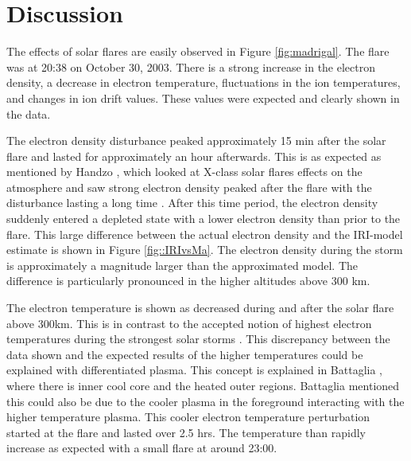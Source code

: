 

\section{Discussion}

The effects of solar flares are easily observed in Figure \ref{fig:madrigal}.
The flare was at 20:38 on October 30, 2003. There is a strong increase in the electron density, a decrease in electron temperature, fluctuations in the ion temperatures, and changes in ion drift values. These values were expected and clearly shown in the data. 

The electron density disturbance peaked approximately 15 min after the solar flare and lasted for approximately an hour afterwards. This is as expected as mentioned by Handzo \cite{Handzo}, which looked at X-class solar flares effects on the atmosphere and saw strong electron density peaked after the flare with the disturbance lasting a long time . After this time period, the electron density suddenly entered a depleted state with a lower electron density than prior to the flare. This large difference between the actual electron density and the IRI-model estimate is shown in Figure \ref{fig::IRIvsMa}. The electron density during the storm is approximately a magnitude larger than the approximated model. The difference is particularly pronounced in the higher altitudes above 300 km.

The electron temperature is shown as decreased during and after the solar flare above 300km. This is in contrast to the accepted notion of highest electron temperatures during the strongest solar storms \cite{Caspi}. This discrepancy between the data shown and the expected results of the higher temperatures could be explained with differentiated plasma. This concept is explained in Battaglia \cite{Battaglia}, where there is inner cool core and the heated outer regions. Battaglia mentioned this could also be due to the cooler plasma in the foreground interacting with the higher temperature plasma. This cooler electron temperature perturbation started at the flare and lasted over 2.5 hrs. The temperature than rapidly increase as expected with a small flare at around 23:00.

